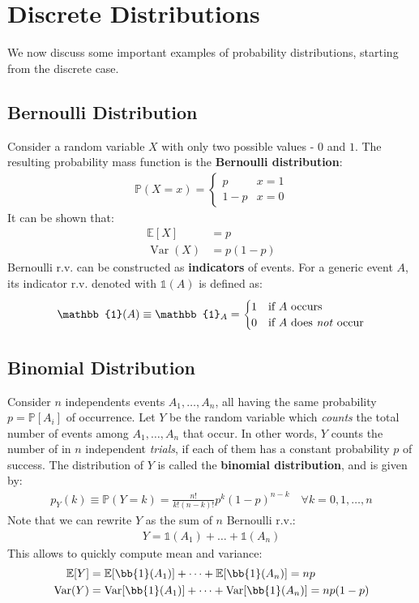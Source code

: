 \documentclass[../template.tex]{subfiles}
\begin{document}
\section{Discrete Distributions}
We now discuss some important examples of probability distributions, starting from the discrete case.

\subsection{Bernoulli Distribution}
Consider a random variable $X$ with only two possible values - $0$ and $1$. The resulting probability mass function is the \textbf{Bernoulli distribution}:
\begin{align*}
    \mathbb{P}(X=x) = \begin{cases}
        p & x = 1\\
        1-p & x = 0
    \end{cases}
\end{align*} 
It can be shown that:
\begin{align*}
    \mathbb{E}[X] &= p\\
    \operatorname{Var}(X) &= p(1-p) 
\end{align*}
Bernoulli r.v. can be constructed as \textbf{indicators} of events. For a generic event $A$, its indicator r.v. denoted with $\mathbb{1}(A)$ is defined as:
\begin{align*}
    \mathbb{1}(A) \equiv \mathbb{1}_A = \begin{cases}
        1 & \text{if $A$ occurs}\\
        0 & \text{if $A$ does \textit{not} occur}
    \end{cases}
\end{align*}

\subsection{Binomial Distribution}
Consider $n$ independents events $A_1, \dots, A_n$, all having the same probability $p=\mathbb{P}[A_i]$ of occurrence. Let $Y$ be the random variable which \textit{counts} the total number of events among $A_1, \dots, A_n$ that occur. In other words, $Y$ counts the number of  in $n$ independent \textit{trials}, if each of them has a constant probability $p$ of success. 
The distribution of $Y$ is called the \textbf{binomial distribution}, and is given by:
\begin{align*}
    p_Y(k) \equiv \mathbb{P}(Y=k) = \frac{n!}{k! (n-k)!} p^k (1-p)^{n-k} \quad \forall k = 0,1,\dots,n 
\end{align*}  
Note that we can rewrite $Y$ as the sum of $n$ Bernoulli r.v.:
\begin{align*}
    Y = \mathbb{1}(A_1) + \dots + \mathbb{1}(A_n)
\end{align*}
This allows to quickly compute mean and variance:
\begin{align*}
    \mathbb{E}[Y] &= \mathbb{E}[\bb{1}(A_1)] + \dots + \mathbb{E}[\bb{1}(A_n)] = np\\
    \operatorname{Var}(Y) &= \operatorname{Var}[\bb{1}(A_1)] + \dots + \operatorname{Var}[\bb{1}(A_n)] = np(1-p)
\end{align*} 
\end{document}
